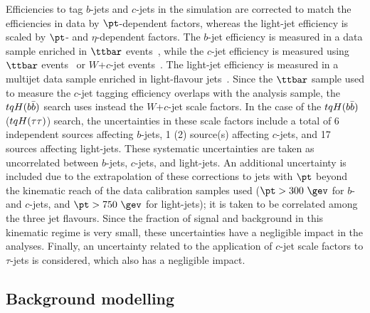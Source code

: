 Efficiencies to tag $b$-jets and $c$-jets in the simulation are corrected to match the efficiencies in data by $\pt$-dependent factors,
whereas the light-jet efficiency is scaled by $\pt$- and $\eta$-dependent factors.
The $b$-jet efficiency is measured in a data sample enriched in $\ttbar$ events~\cite{Aaboud:2018xwy}, while the $c$-jet efficiency is measured
using $\ttbar$ events~\cite{ATLAS-CONF-2018-001} or $W$+$c$-jet events~\cite{Aad:2015ydr}. 
The light-jet efficiency is measured in a multijet data sample enriched in light-flavour jets~\cite{ATLAS-CONF-2018-006}.
Since the $\ttbar$ sample used to measure the $c$-jet tagging efficiency overlaps with the analysis sample, the $tqH(b\bar{b})$ search uses
instead the $W$+$c$-jet scale factors.  
In the case of the $tqH(b\bar{b})$ ($tqH(\tau\tau)$) search, the uncertainties in these scale factors include 
a total of 6 independent sources affecting $b$-jets, 1 (2) source(s) affecting $c$-jets, and 17 sources affecting light-jets. 
These systematic uncertainties are taken as uncorrelated between $b$-jets, $c$-jets, and light-jets. 
An additional uncertainty is included due to the extrapolation of these corrections to jets 
with $\pt$ beyond the kinematic reach of the data calibration samples used ($\pt>300~\gev$ for $b$- and $c$-jets, 
and $\pt>750~\gev$ for light-jets); it is taken to be correlated among the three jet flavours. 
Since the fraction of signal and background in this kinematic regime is very small, these uncertainties have a negligible
impact in the analyses.
Finally, an uncertainty related to the application of $c$-jet scale factors to $\tau$-jets is considered,
which also has a negligible impact.

\subsection{Background modelling}
\label{sec:syst_bkgmodeling}


